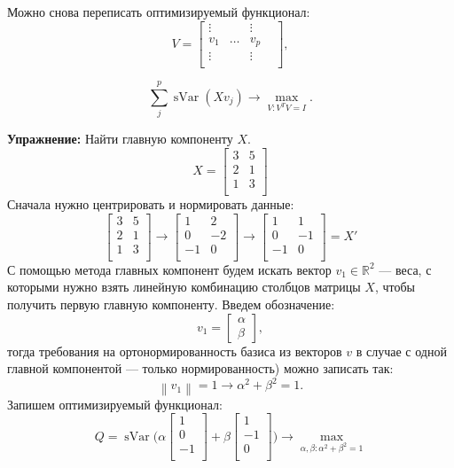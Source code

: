 \documentclass[12pt]{article} %
\theoremstyle{definition} %
\DeclareMathOperator{\sVar}{sVar}
\def \RR{\mathbb{R}}
\begin{document}
Можно снова переписать оптимизируемый функционал:
\[
V = \begin{bmatrix}
    \vdots & & \vdots & \\
    v_1 & \dots &v_p \\
    \vdots & & \vdots & \\
    \end{bmatrix},
\]

\[ \sum_{j}^p \sVar(Xv_j) \to \max_{V: V^TV=I}. \]

\textbf{Упражнение:} Найти главную компоненту \(X\).
\[
X =
\begin{bmatrix}
3 & 5\\
2 & 1\\
1 & 3\\
\end{bmatrix}
\]
Сначала нужно центрировать и нормировать данные:
\[
\begin{bmatrix}
3 & 5\\
2 & 1\\
1 & 3\\
\end{bmatrix}
\to
\begin{bmatrix}
1 & 2\\
0 & -2\\
-1 & 0\\
\end{bmatrix}
\to
\begin{bmatrix}
1 & 1\\
0 & -1\\
-1 & 0\\
\end{bmatrix}
=X'
\]
С помощью метода главных компонент будем искать вектор \(v_1 \in \RR^2\) —  веса, с которыми нужно взять линейную комбинацию столбцов матрицы \(X\), чтобы получить первую главную компоненту. Введем обозначение:
\[v_1
= \begin{bmatrix}
\alpha\\
\beta
\end{bmatrix},
\]
тогда требования на ортонормированность базиса из векторов \(v\) в случае с одной главной компонентой  — только нормированность) можно записать так:
\[ \left\| v_1 \right\| = 1 \to \alpha^2 + \beta^2 = 1. \]
Запишем оптимизируемый функционал:
\[
Q = \sVar \bigg(
\alpha \begin{bmatrix}
1\\
0\\
-1\\
\end{bmatrix}
+
\beta \begin{bmatrix}
1\\
-1\\
0\\
\end{bmatrix}
\bigg)
\to \max_{\alpha, \beta : \alpha^2+\beta^2=1}
\]
\end{document}
